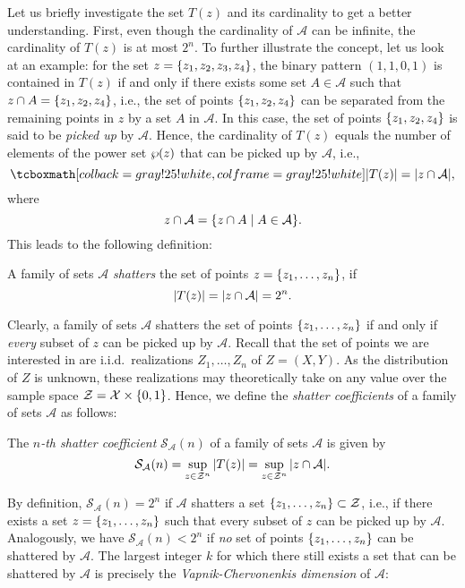 Let us briefly investigate the set $T(z)$ and its cardinality to get a better understanding. First, even though the cardinality of $\mathcal{A}$ can be infinite, the cardinality of $T(z)$ is at most $2^n$. To further illustrate the concept, let us look at an example: for the set $z = \set{z_1, z_2, z_3, z_4}$, the binary pattern $(1, 1, 0, 1)$ is contained in $T(z)$ if and only if there exists some set $A \in \mathcal{A}$ such that $z \cap A = \set{z_1, z_2, z_4}$, i.e., the set of points $\set {z_1, z_2, z_4}$ can be separated from the remaining points in $z$ by a set $A$ in $\mathcal{A}$. In this case, the set of points $\set{z_1, z_2, z_4}$ is said to be \emph{picked up} by $\mathcal{A}$. Hence, the cardinality of $T(z)$ equals the number of elements of the power set $\operatorname{\wp}(z)$ that can be picked up by $\mathcal{A}$, i.e.,
\[
    \highlightMath{
        \abs{T(z)} = \abs{z \cap \mathcal{A}},
    }
\]
where
\[
    z \cap \mathcal{A} = \set{z \cap A \with A \in \mathcal{A}}.
\]
This leads to the following definition:

\begin{definition}
A family of sets $\mathcal{A}$ \emph{shatters} the set of points $z = \set{z_1, \dots, z_n}$, if
\[
    \abs{T(z)} = \abs{z \cap \mathcal{A}} = 2^n.
\]
\end{definition}

Clearly, a family of sets $\mathcal{A}$ shatters the set of points $\set{z_1, \dots, z_n}$ if and only if \emph{every} subset of $z$ can be picked up by $\mathcal{A}$. Recall that the set of points we are interested in are i.i.d.\ realizations $Z_1, \dots, Z_n$ of $Z = (X, Y)$. As the distribution of $Z$ is unknown, these realizations may theoretically take on any value over the sample space $\mathcal{Z} = \mathcal{X} \times \set{0, 1}$. Hence, we define the \emph{shatter coefficients} of a family of sets $\mathcal{A}$ as follows:

\begin{definition}
The \emph{$n$-th shatter coefficient} $\mathcal{S}_{\mathcal{A}}(n)$ of a family of sets $\mathcal{A}$ is given by
\[
    \mathcal{S}_{\mathcal{A}}(n) = \sup_{z \in \mathcal{Z}^n} \abs{T(z)} = \sup_{z \in \mathcal{Z}^n} \abs{z \cap \mathcal{A}}.
\]
\end{definition}

By definition, $\mathcal{S}_{\mathcal{A}}(n) = 2^n$ if $\mathcal{A}$ shatters a set $\set{z_1, \dots, z_n} \subset \mathcal{Z}$, i.e., if there exists a set $z = \set{z_1, \dots, z_n}$ such that every subset of $z$ can be picked up by $\mathcal{A}$. Analogously, we have $\mathcal{S}_{\mathcal{A}}(n) < 2^n$ if \emph{no} set of points $\set{z_1, \dots, z_n}$ can be shattered by $\mathcal{A}$. The largest integer $k$ for which there still exists a set that can be shattered by $\mathcal{A}$ is precisely the \emph{Vapnik-Chervonenkis dimension} of $\mathcal{A}$:

